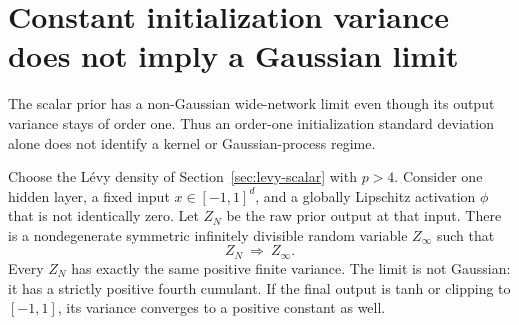 \section{Constant initialization variance does not imply a Gaussian limit}
\label{sec:levy-native-scale}
The scalar prior has a non-Gaussian wide-network limit even though its output variance stays of order one. Thus an order-one initialization standard deviation alone does not identify a kernel or Gaussian-process regime.

\begin{proposition}
\label{prop:levy-native-limit}
Choose the L\'evy density of Section~\ref{sec:levy-scalar} with $p>4$. Consider one hidden layer, a fixed input $x\in[-1,1]^d$, and a globally Lipschitz activation $\phi$ that is not identically zero. Let $Z_N$ be the raw prior output at that input. There is a nondegenerate symmetric infinitely divisible random variable $Z_\infty$ such that
\[
 Z_N\ \Longrightarrow\ Z_\infty.
\]
Every $Z_N$ has exactly the same positive finite variance. The limit is not Gaussian: it has a strictly positive fourth cumulant. If the final output is tanh or clipping to $[-1,1]$, its variance converges to a positive constant as well.
\end{proposition}
